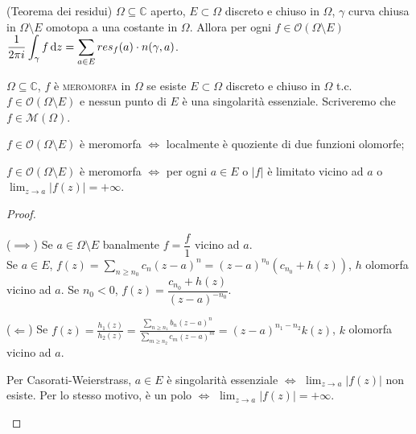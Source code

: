 \begin{thm}
  (Teorema dei residui) $\Omega \subseteq \mathbb{C}$ aperto, $E \subset \Omega$ discreto e chiuso in $\Omega$, $\gamma$ curva chiusa in $\Omega \setminus E$ omotopa a una costante in $\Omega$.
  Allora per ogni $f \in \mathcal{O}(\Omega \setminus E)$ $\displaystyle \frac{1}{2\pi i} \int_{\gamma} f \mathop{}\!\mathrm{d} z=\sum_{a \in E} res_f(a) \cdot n(\gamma, a)$.
\end{thm}

\begin{defn}
  $\Omega \subseteq \mathbb{C}$, $f$ è \textsc{meromorfa} in $\Omega$ se esiste $E \subset \Omega$ discreto e chiuso in $\Omega$ t.c. $f \in \mathcal{O}(\Omega \setminus E)$ e nessun punto di $E$ è una singolarità essenziale. Scriveremo che $f \in \mathcal{M}(\Omega)$.
\end{defn}

\begin{prop}
  \begin{nlist}
    \item $f \in \mathcal{O}(\Omega \setminus E)$ è meromorfa $\iff$ localmente è quoziente di due funzioni olomorfe;
    \item $f \in \mathcal{O}(\Omega \setminus E)$ è meromorfa $\iff$ per ogni $a \in E$ o $|f|$ è limitato vicino ad $a$ o $\displaystyle \lim_{z \rightarrow a} |f(z)|=+\infty$.
  \end{nlist}
\end{prop}

\begin{proof}
  \begin{nlist}
    \item ($\implies$) Se $a \in \Omega \setminus E$ banalmente $f=\dfrac{f}{1}$ vicino ad $a$. \\
    Se $a \in E$, $\displaystyle f(z)=\sum_{n \ge n_0} c_n(z-a)^n=(z-a)^{n_0}(c_{n_0}+h(z))$, $h$ olomorfa vicino ad $a$. Se $n_0<0$, $f(z)=\dfrac{c_{n_0}+h(z)}{(z-a)^{-n_0}}$.

    ($\Leftarrow$) Se $\displaystyle f(z)=\frac{h_1(z)}{h_2(z)}=\frac{\sum_{n \ge n_1} b_n(z-a)^n}{\sum_{m \ge n_2} c_m(z-a)^m}=(z-a)^{n_1-n_2}k(z)$, $k$ olomorfa vicino ad $a$.
    \item Per Casorati-Weierstrass, $a \in E$ è singolarità essenziale $\iff$ $\displaystyle \lim_{z \rightarrow a} |f(z)|$ non esiste. Per lo stesso motivo, è un polo $\iff$ $\displaystyle \lim_{z \rightarrow a} |f(z)|=+\infty$.
  \end{nlist}
\end{proof}

